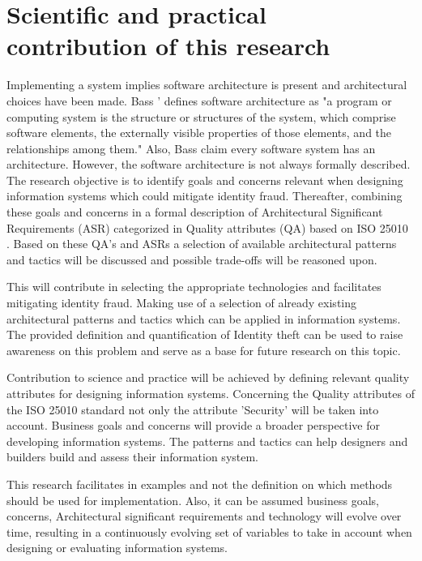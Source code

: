 \section{Scientific and practical contribution of this research}
Implementing a system implies software architecture is present and architectural choices have been made. Bass '\etal \cite{Bass2015SoftwareAI} defines software architecture as "a program or computing system is the structure or structures of the system, which comprise software elements, the externally visible properties of those elements, and the relationships among them." Also, Bass \etal claim every software system has an architecture. However, the software architecture is not always formally described.
The research objective is to identify goals and concerns relevant when designing information systems which could mitigate identity fraud. Thereafter, combining these goals and concerns in a formal description of Architectural Significant Requirements (ASR) categorized in Quality attributes (QA) based on ISO 25010 \cite{ISO:25010:2011}. Based on these QA's and ASRs a selection of available architectural patterns and tactics will be discussed and possible trade-offs will be reasoned upon.

This will contribute in selecting the appropriate technologies and facilitates mitigating identity fraud. Making use of a selection of already existing architectural patterns and tactics which can be applied in information systems. The provided definition and quantification of Identity theft can be used to raise awareness on this problem and serve as a base for future research on this topic.

Contribution to science and practice will be achieved by defining relevant quality attributes for designing information systems. Concerning the Quality attributes of the ISO 25010 standard not only the attribute 'Security' will be taken into account. Business goals and concerns will provide a broader perspective for developing information systems. The patterns and tactics can help designers and builders build and assess their information system.

This research facilitates in examples and not the definition on which methods should be used for implementation. Also, it can be assumed business goals, concerns, Architectural significant requirements and technology will evolve over time, resulting in a continuously evolving set of variables to take in account when designing or evaluating information systems.